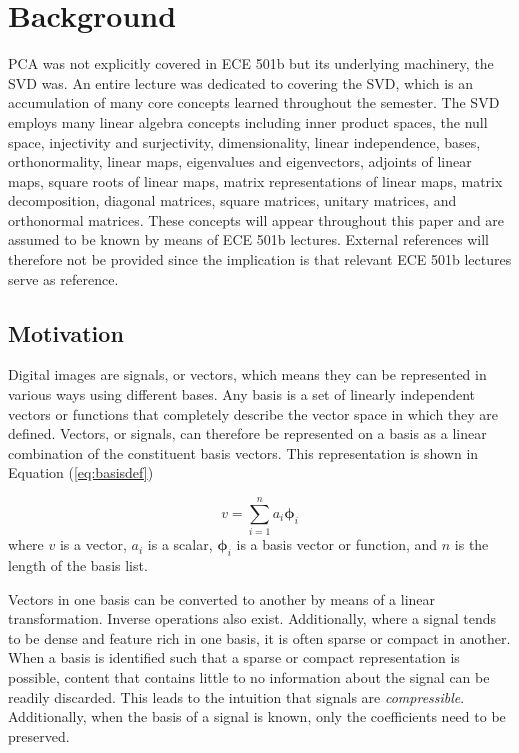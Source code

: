 \documentclass[conference]{IEEEtran}
\begin{document}
    \section{Background}
    PCA was not explicitly covered in ECE 501b but its underlying machinery, the SVD was. An entire lecture was dedicated to covering the SVD, which is an accumulation of many core concepts learned throughout the semester. The SVD employs many linear algebra concepts including inner product spaces, the null space, injectivity and surjectivity, dimensionality, linear independence, bases, orthonormality, linear maps, eigenvalues and eigenvectors, adjoints of linear maps, square roots of linear maps, matrix representations of linear maps, matrix decomposition, diagonal matrices, square matrices, unitary matrices, and orthonormal matrices. These concepts will appear throughout this paper and are assumed to be known by means of ECE 501b lectures. External references will therefore not be provided since the implication is that relevant ECE 501b lectures serve as reference.

    \subsection{Motivation}
    Digital images are signals, or vectors, which means they can be represented in various ways using different bases. Any basis is a set of linearly independent vectors or functions that completely describe the vector space in which they are defined. Vectors, or signals, can therefore be represented on a basis as a linear combination of the constituent basis vectors. This representation is shown in Equation (\ref{eq:basisdef})

    \begin{equation}
        v = \sum_{i=1}^{n} a_i \mathbf{\phi}_{i}
    \label{eq:basisdef}
    \end{equation}
    where $v$ is a vector, $a_i$ is a scalar, $\mathbf{\phi}_{i}$ is a basis vector or function, and $n$ is the length of the basis list.

    Vectors in one basis can be converted to another by means of a linear transformation. Inverse operations also exist. Additionally, where a signal tends to be dense and feature rich in one basis, it is often sparse or compact in another. When a basis is identified such that a sparse or compact representation is possible, content that contains little to no information about the signal can be readily discarded. This leads to the intuition that signals are \textit{compressible}. Additionally, when the basis of a signal is known, only the coefficients need to be preserved.
\end{document}
